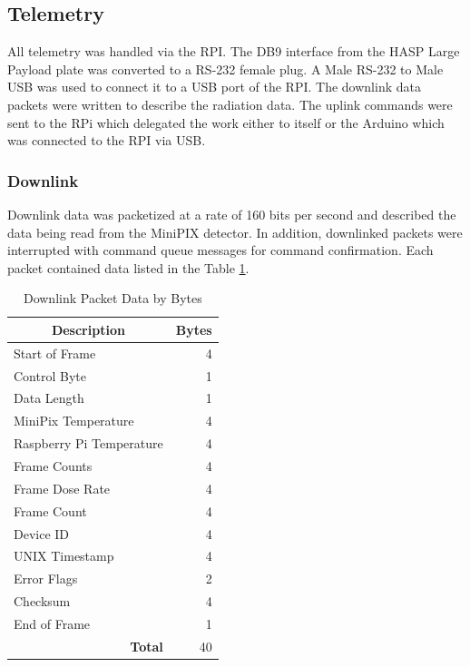 \subsection{Telemetry}
\label{sec:Telemetry}

All telemetry was handled via the RPI. The DB9 interface from the HASP Large Payload plate was converted to a 
RS-232 female plug. A Male RS-232 to Male USB was used to connect it to a USB port of the RPI. 
The downlink data packets were written to describe the radiation data. 
The uplink commands were sent to the RPi which delegated the work either to itself or the Arduino which 
was connected to the RPI via USB.

\subsubsection{Downlink}
\label{sec:Downlink}
Downlink data was packetized at a rate of 160 bits per second and described the data being read from the MiniPIX detector. 
In addition, downlinked packets were interrupted with command queue messages for command confirmation.
Each packet contained data listed in the Table \ref{tab:packets}. 

\begin{table}[H]
\centering
\caption{Downlink Packet Data by Bytes}
\label{tab:packets}
\bigskip
\begin{tabular}{l|r}
\hline
\hline
\multicolumn{1}{c|}{\bf{Description}}				& \multicolumn{1}{c}{\bf{Bytes}}	\\
\hline
Start of Frame 						& 	4 			\\
\hline
Control Byte 						& 	1 			\\
\hline
Data Length 						& 	1 			\\
\hline
MiniPix Temperature 				&	4 			\\
\hline
Raspberry Pi Temperature 			& 	4 			\\
\hline
Frame Counts 						& 	4 			\\
\hline
Frame Dose Rate 					& 	4 			\\
\hline
Frame Count 						& 	4 			\\
\hline
Device ID 							& 	4 			\\
\hline
UNIX Timestamp 						& 	4 			\\
\hline
Error Flags							&	2 			\\
\hline
Checksum							& 	4			\\
\hline
End of Frame 						& 	1			\\
\hline
\multicolumn{1}{r|}{\bf{Total}}   	& 	40  		\\
\hline
\end{tabular}
\end{table}

